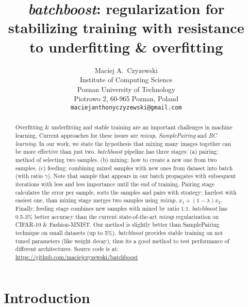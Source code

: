 \documentclass{article}
\title{\emph{batchboost}: regularization for stabilizing training with
	resistance to underfitting \& overfitting}
\author{
  Maciej A.~Czyzewski\\
  Institute of Computing Science\\
  Poznan University of Technology\\
  Piotrowo 2, 60-965 Poznan, Poland\\
  \texttt{maciejanthonyczyzewski@gmail.com} \\
}
\begin{document}
\maketitle



\begin{abstract}
	Overfitting \& underfitting and stable training are an important challenges in
	machine learning.
Current approaches for these issues are \emph{mixup}\cite{zhang2017mixup},
	\emph{SamplePairing}\cite{inoue2018data}
	and \emph{BC learning}\cite{tokozume2018between}.
	In our work, we state the hypothesis that mixing many images together can be more
	effective than just two.
	\emph{batchboost} pipeline has three stages:
	(a) pairing: method of selecting two samples.
	(b) mixing: how to create a new one from two samples.
	(c) feeding: combining mixed samples with new ones from dataset into batch (with ratio $\gamma$).
	Note that sample that appears in our batch propagates with
	subsequent iterations with less and less importance until the end of training.
Pairing stage calculates the error per sample, sorts the samples and pairs
	with strategy: hardest with easiest one, than mixing stage merges two samples
	using \emph{mixup}, $x_1 + (1-\lambda)x_2$. Finally, feeding stage combines
	new samples with mixed by ratio 1:1. 
\emph{batchboost} has 0.5-3\% better accuracy than the current
	state-of-the-art \emph{mixup} regularization on
	CIFAR-10\cite{krizhevsky2009learning} \&
	Fashion-MNIST\cite{xiao2017}.
Our method is slightly better than SamplePairing technique
	on small datasets (up to 5\%).
\emph{batchboost} provides stable training on not tuned parameters (like weight
	decay), thus its a good method to test performance of different architectures.
Source code is at: \url{https://github.com/maciejczyzewski/batchboost}
\end{abstract}


\section{Introduction}
\label{sec:introduction}
\end{document}
